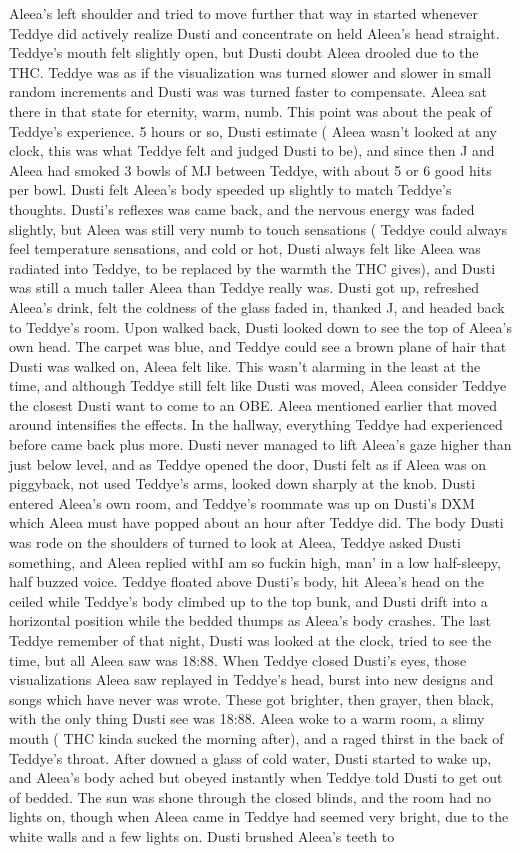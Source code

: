 \documentclass[12pt]{book}
\begin{document}
Aleea's left shoulder and tried to move further that way in started whenever Teddye did actively realize Dusti and concentrate on held Aleea's head straight. Teddye's mouth felt slightly open, but Dusti doubt Aleea drooled due to the THC. Teddye was as if the visualization was turned slower and slower in small random increments and Dusti was was turned faster to compensate. Aleea sat there in that state for eternity, warm, numb. This point was about the peak of Teddye's experience. 5 hours or so, Dusti estimate ( Aleea wasn't looked at any clock, this was what Teddye felt and judged Dusti to be), and since then J and Aleea had smoked 3 bowls of MJ between Teddye, with about 5 or 6 good hits per bowl. Dusti felt Aleea's body speeded up slightly to match Teddye's thoughts. Dusti's reflexes was came back, and the nervous energy was faded slightly, but Aleea was still very numb to touch sensations ( Teddye could always feel temperature sensations, and cold or hot, Dusti always felt like Aleea was radiated into Teddye, to be replaced by the warmth the THC gives), and Dusti was still a much taller Aleea than Teddye really was. Dusti got up, refreshed Aleea's drink, felt the coldness of the glass faded in, thanked J, and headed back to Teddye's room. Upon walked back, Dusti looked down to see the top of Aleea's own head. The carpet was blue, and Teddye could see a brown plane of hair that Dusti was walked on, Aleea felt like. This wasn't alarming in the least at the time, and although Teddye still felt like Dusti was moved, Aleea consider Teddye the closest Dusti want to come to an OBE. Aleea mentioned earlier that moved around intensifies the effects. In the hallway, everything Teddye had experienced before came back plus more. Dusti never managed to lift Aleea's gaze higher than just below level, and as Teddye opened the door, Dusti felt as if Aleea was on piggyback, not used Teddye's arms, looked down sharply at the knob. Dusti entered Aleea's own room, and Teddye's roommate was up on Dusti's DXM which Aleea must have popped about an hour after Teddye did. The body Dusti was rode on the shoulders of turned to look at Aleea, Teddye asked Dusti something, and Aleea replied withI am so fuckin high, man' in a low half-sleepy, half buzzed voice. Teddye floated above Dusti's body, hit Aleea's head on the ceiled while Teddye's body climbed up to the top bunk, and Dusti drift into a horizontal position while the bedded thumps as Aleea's body crashes. The last Teddye remember of that night, Dusti was looked at the clock, tried to see the time, but all Aleea saw was 18:88. When Teddye closed Dusti's eyes, those visualizations Aleea saw replayed in Teddye's head, burst into new designs and songs which have never was wrote. These got brighter, then grayer, then black, with the only thing Dusti see was 18:88. Aleea woke to a warm room, a slimy mouth ( THC kinda sucked the morning after), and a raged thirst in the back of Teddye's throat. After downed a glass of cold water, Dusti started to wake up, and Aleea's body ached but obeyed instantly when Teddye told Dusti to get out of bedded. The sun was shone through the closed blinds, and the room had no lights on, though when Aleea came in Teddye had seemed very bright, due to the white walls and a few lights on. Dusti brushed Aleea's teeth to 
\end{document}
